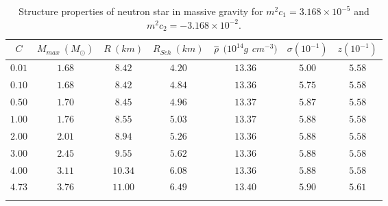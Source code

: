 \documentclass[aps]{revtex4}
\begin{document}
\begin{table*}[tbp]
\caption{Structure properties of neutron star in massive gravity for $%
m^{2}c_{1}=3.168\times 10^{-5}$ and $m^{2}c_{2}=-3.168\times 10^{-2}$.}
\label{tab2}
\begin{center}
\begin{tabular}{ccccccc}
\hline\hline
$C$ & ${M_{max}}\ (M_{\odot})$ & $R\ (km)$ & $R_{Sch}\ (km)$ & $\overline{%
\rho }$ $(10^{14}g$ $cm^{-3})$ & $\sigma (10^{-1})$ & $z(10^{-1})$ \\
\hline\hline
$0.01$ & $1.68$ & $8.42$ & $4.20$ & $13.36$ & $5.00$ & $5.58$ \\ \hline
$0.10$ & $1.68$ & $8.42$ & $4.84$ & $13.36$ & $5.75$ & $5.58$ \\ \hline
$0.50$ & $1.70$ & $8.45$ & $4.96$ & $13.37$ & $5.87$ & $5.58$ \\ \hline
$1.00$ & $1.76$ & $8.55$ & $5.03$ & $13.37$ & $5.88$ & $5.58$ \\ \hline
$2.00$ & $2.01$ & $8.94$ & $5.26$ & $13.36$ & $5.88$ & $5.58$ \\ \hline
$3.00$ & $2.45$ & $9.55$ & $5.62$ & $13.36$ & $5.88$ & $5.58$ \\ \hline
$4.00$ & $3.11$ & $10.34$ & $6.08$ & $13.36$ & $5.88$ & $5.58$ \\ \hline
$4.73$ & $3.76$ & $11.00$ & $6.49$ & $13.40$ & $5.90$ & $5.61$ \\
\hline\hline
&  &  &  &  &  &
\end{tabular}%
\end{center}
\end{table*}
\end{document}

